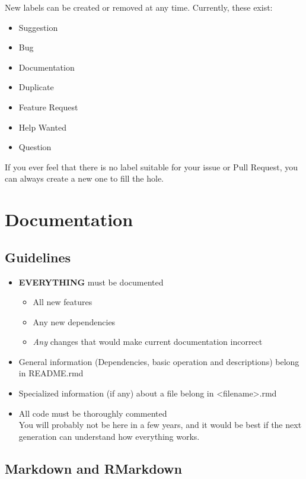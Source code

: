 \documentclass{article}
\begin{document}
\noindent
New labels can be created or removed at any time. Currently, these exist:
\begin{itemize}
	\item Suggestion
	\item Bug
	\item Documentation
	\item Duplicate
	\item Feature Request
	\item Help Wanted
	\item Question
\end{itemize}

\noindent
If you ever feel that there is no label suitable for your issue or Pull Request, you can always create a new one to fill the hole.

\pagebreak

\section{Documentation}

\subsection{Guidelines}

\begin{itemize}
	\item \textbf{EVERYTHING} must be documented
		\begin{itemize}
			\item All new features
			\item Any new dependencies
			\item \textit{Any} changes that would make current documentation incorrect
		\end{itemize}	
	\item General information (Dependencies, basic operation and descriptions) belong in README.rmd
	\item Specialized information (if any) about a file belong in \textless filename\textgreater.rmd
	\item All code must be thoroughly commented
		\\You will probably not be here in a few years, and it would be best if the next generation can understand how everything works.
\end{itemize}

\subsection{Markdown and RMarkdown}
\end{document}
